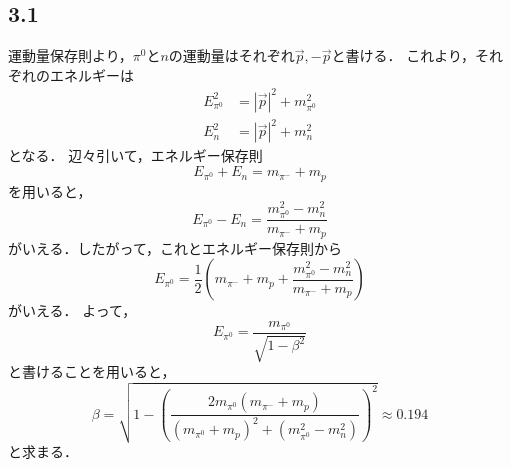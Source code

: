 \subsection*{3.1}
運動量保存則より，$\pi^0$と$n$の運動量はそれぞれ$\vec{p}, -\vec{p}$と書ける．
これより，それぞれのエネルギーは
\begin{align}
  E_{\pi^0}^2 &= \left|\vec{p}\right|^2 + m_{\pi^0}^2 \\
  E_{n}^2 &= \left|\vec{p}\right|^2 + m_{n}^2 
\end{align}
となる．
辺々引いて，エネルギー保存則
\begin{equation}
  E_{\pi^0} + E_{n} = m_{\pi^-} + m_{p}
\end{equation}
を用いると，
\begin{equation}
  E_{\pi^0} - E_{n} = \frac{m_{\pi^0}^2-m_{n}^2}{m_{\pi^-} + m_{p}}
\end{equation}
がいえる．したがって，これとエネルギー保存則から
\begin{equation}
  E_{\pi^0} = \frac{1}{2} \left(m_{\pi^-} + m_{p} + \frac{m_{\pi^0}^2-m_{n}^2}{m_{\pi^-} + m_{p}}\right)
\end{equation}
がいえる．
よって，
\begin{equation}
  E_{\pi^0} = \frac{m_{\pi^0}}{\sqrt{1-\beta^2}}
\end{equation}
と書けることを用いると，
\begin{equation}
  \beta = \sqrt{1- \left(\frac{2m_{\pi^0}(m_{\pi^-}+m_p)}{(m_{\pi^0}+m_p)^2+(m_{\pi^0}^2-m_n^2)}\right)^2} \approx 0.194
\end{equation}
と求まる．

